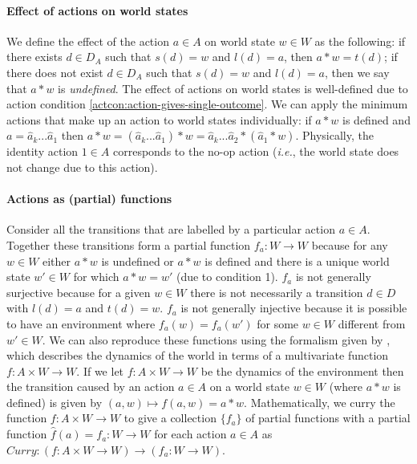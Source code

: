 \paragraph{Effect of actions on world states}
We define the effect of the action $a \in A$ on world state $w \in W$ as the following: if there exists $d \in D_{A}$ such that $s(d)=w$ and $l(d)=a$, then $a * w = t(d)$; if there does not exist $d \in D_{A}$ such that $s(d)=w$ and $l(d)=a$, then we say that $a * w$ is \textit{undefined}.
The effect of actions on world states is well-defined due to action condition \ref{actcon:action-gives-single-outcome}.
We can apply the minimum actions that make up an action to world states individually: if $a * w$ is defined and $a = \hat{a}_{k}...\hat{a}_{1}$ then $a * w = (\hat{a}_{k}...\hat{a}_{1}) * w = \hat{a}_{k}...\hat{a}_{2} * (\hat{a}_{1} * w)$.
Physically, the identity action $1 \in A$ corresponds to the no-op action (\textit{i.e.}, the world state does not change due to this action).

\paragraph{Actions as (partial) functions}
Consider all the transitions that are labelled by a particular action $a \in A$.
Together these transitions form a partial function $f_{a}: W \to W$ because for any $w \in W$ either $a * w$ is undefined or $a * w$ is defined and there is a unique world state $w' \in W$ for which $a * w = w'$ (due to condition 1).
$f_{a}$ is not generally surjective because for a given $w \in W$ there is not necessarily a transition $d \in D$ with $l(d) = a$ and $t(d) = w$.
$f_{a}$ is not generally injective because it is possible to have an environment where $f_{a}(w)=f_{a}(w')$ for some $w \in W$ different from $w' \in W$.
We can also reproduce these functions using the formalism given by \autocite{caselles2019symmetry}, which describes the dynamics of the world in terms of a multivariate function $f: A \times W \to W$.
If we let $f: A \times W \to W$ be the dynamics of the environment then the transition caused by an action $a \in A$ on a world state $w \in W$ (where $a * w$ is defined) is given by $(a,w) \mapsto f(a,w) = a * w$.
Mathematically, we curry the function $f: A \times W \to W$ to give a collection $\{f_{a}\}$ of partial functions with a partial function $\hat{f}(a)=f_{a}: W \to W$ for each action $a \in A$ as $\textit{Curry}: (f: A \times W \to W) \to (f_{a}: W \to W)$.
